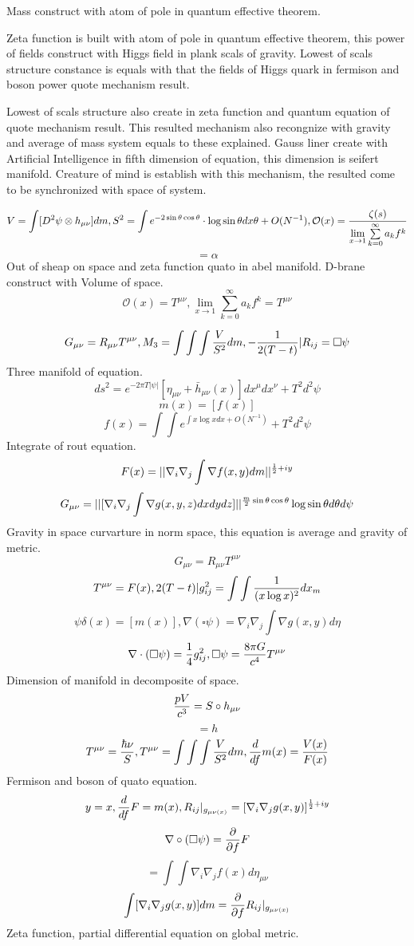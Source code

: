 \documentclass{jsarticle}
\begin{document}
  Mass construct with atom of pole in quantum effective theorem.



  Zeta function is built with atom of pole in quantum effective theorem, this power of fields 
construct with Higgs field in plank scals of gravity.
Lowest of scals structure constance is equals with that the fields of Higgs quark in fermison and boson power
quote mechanism result.

  Lowest of scals structure also create in zeta function and quantum equation of quote mechanism result. 
This resulted mechanism also recongnize with gravity and average of mass system equals to these explained.
  Gauss liner create with Artificial Intelligence in fifth dimension of equation, this dimension is seifert manifold.
Creature of mind is establish with this mechanism, the resulted come to be synchronized with space of system.



$$ V = \int [D^2\psi \otimes h_{\mu\nu}]dm, S^2 = \int e^{-2 \sin \theta \cos \theta}\cdot \log \sin \theta dx \theta 
+ O(N^{-1}), \mathcal{O}(x) = {\zeta (s) \over \lim\limits_{x \to 1}\sum\limits_{k=0}^{\infty}a_k f^k} $$ 
$$ = \alpha $$
Out of sheap on space and zeta function quato in abel manifold.
D-brane construct with Volume of space.
$$ \mathcal{O}(x) = T^{\mu\nu}, \lim\limits_{x \to 1}\sum_{k=0}^{\infty}a_k f^k = T^{\mu\nu} $$

$$ G_{\mu\nu} = R_{\mu\nu}T^{\mu\nu}, M_3 = \int \int \int{V \over S^2}dm, -{1 \over 2(T - t)}|R_{ij} = \square \psi $$
Three manifold of equation.
$$ ds^2 = e^{-2 \pi T|\psi|}[\eta_{\mu\nu} + \bar{h}_{\mu\nu}(x)]dx^{\mu}dx^{\nu} + T^2 d^2 \psi $$
$$ m(x) = [f(x)] $$
$$ f(x) = \int \int e^{\int x \log x dx + O(N^{-1})} + T^2 d^2 \psi $$
Integrate of rout equation.
$$ F(x) = ||\nabla_{i}\nabla_{j}\int \nabla f(x,y)dm||^{{1 \over 2} + iy} $$
$$ G_{\mu\nu} = ||[\nabla_{i}\nabla_{j}\int \nabla g(x,y,z)dxdydz]||^{{m \over 2}\sin \theta \cos \theta}
\log \sin \theta d\theta d\psi $$
Gravity in space curvarture in norm space, this equation is average and gravity of metric.
$$ G_{\mu\nu} = R_{\mu\nu}T^{\mu\nu} $$
$$ T^{\mu\nu} = F(x),  2(T - t)|g^2_{ij} = \int \int {1 \over (x \log x)^2}dx_m $$
$$ \psi \delta (x) = [m(x)], \nabla (\square \psi) = \nabla_{i}\nabla_{j} \int \nabla g(x,y) d\eta $$
$$ \nabla \cdot (\square \psi) = {1 \over 4}g^2_{ij}, \square \psi = {8 \pi G \over c^4}T^{\mu\nu} $$
Dimension of manifold in decomposite of space.
$$ {p V \over c^3} = S \circ h_{\mu\nu} $$
$$ = h $$
$$ T^{\mu\nu} = {\hbar \nu \over S}, T^{\mu\nu} = \int \int \int{V \over S^2}dm, {d \over df}m(x) = {V(x) \over F(x)} $$
Fermison and boson of quato equation.
$$ y = x, {d \over df}F= m(x), R_{ij}|_{g_{\mu\nu(x)}} = [\nabla_{i}\nabla_{j} g(x,y)]^{{1 \over 2} + iy} $$
$$ \nabla \circ (\square \psi) = {\partial \over \partial f} F$$
$$ = \int \int \nabla_{i}\nabla_{j}f(x) d \eta_{\mu\nu} $$
$$ \int[\nabla_{i}\nabla_{j} g(x,y)]dm = {\partial \over \partial f}R_{ij}|_{g_{\mu\nu(x)}} $$
Zeta function, partial differential equation on global metric.
\end{document}
